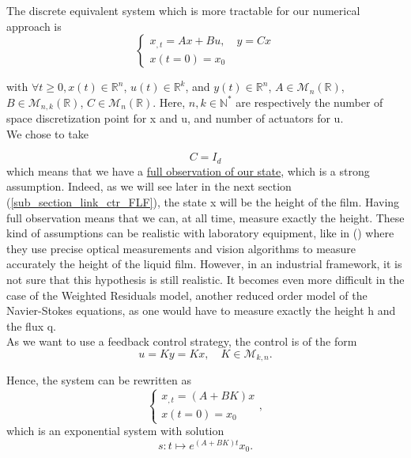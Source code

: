 \documentclass[12pt]{article}
\begin{document}
The discrete equivalent system which is more tractable for our numerical approach is 
\begin{equation}\label{Ctrl_framework_discrete}
    \left\{ 
    \begin{aligned}
        x_{,t} = Ax+Bu, \quad y=Cx\\
        x(t=0) = x_0
    \end{aligned}
    \right.
\end{equation}

with $\forall t\geq 0, x(t)\in \mathbb{R}^n$, $u(t)\in \mathbb{R}^k$, and $y(t) \in \mathbb{R}^n$, $A \in \mathcal{M}_{n}(\mathbb{R})$, $B \in \mathcal{M}_{n, k}(\mathbb{R})$, $C \in \mathcal{M}_{n}(\mathbb{R})$. Here, $n,k \in  \mathbb{N}^*$ are respectively the number of space discretization point for x and u, and number of actuators for u. \\

We chose to take 

\begin{equation}
    C = I_d
\end{equation}
which means that we have a \underline{ full observation of our state}, which is a strong assumption. Indeed, as we will see later in the next section (\ref{sub_section_link_ctr_FLF}), the state x will be the height of the film. Having full observation means that we can, at all time, measure exactly the height. These kind of assumptions can be realistic with laboratory equipment, like in (\cite{experimental_paper}) where they use precise optical measurements and vision algorithms to measure accurately the height of the liquid film. However, in an industrial framework, it is not sure that this hypothesis is still realistic. It becomes even more difficult in the case of the Weighted Residuals model, another reduced order model of the Navier-Stokes equations, as one would have to measure exactly the height h and the flux q. 
\\

As we want to use a feedback control strategy, the control is of the form 
\begin{equation}
    u = Ky = Kx, \quad K \in \mathcal{M}_{k,n}.
\end{equation}

Hence, the system can be rewritten as 
\begin{equation}\label{expo_ctrl_system}
    \left\{
    \begin{aligned}
        x_{,t}=(A+BK)x \\
        x(t=0) = x_0
    \end{aligned}
    \right.,
\end{equation}
which is an exponential system with solution $$s:t\mapsto  e^{(A+BK)t}x_0.$$
\end{document}
